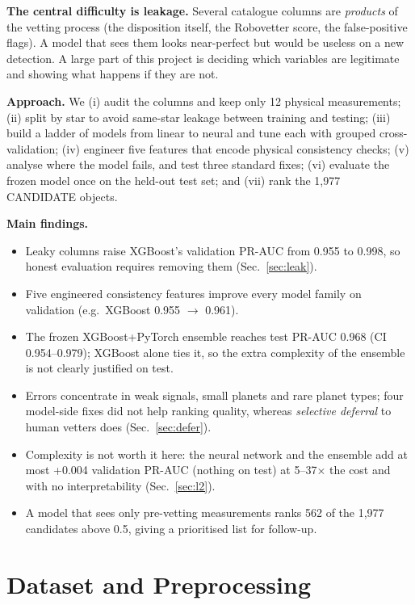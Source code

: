 \documentclass[11pt,a4paper]{article}
\begin{document}
\textbf{The central difficulty is leakage.} Several catalogue columns are \emph{products} of the vetting process (the disposition itself, the Robovetter score, the false-positive flags). A model that sees them looks near-perfect but would be useless on a new detection. A large part of this project is deciding which variables are legitimate and showing what happens if they are not.

\textbf{Approach.} We (i) audit the columns and keep only 12 physical measurements; (ii) split by star to avoid same-star leakage between training and testing; (iii) build a ladder of models from linear to neural and tune each with grouped cross-validation; (iv) engineer five features that encode physical consistency checks; (v) analyse where the model fails, and test three standard fixes; (vi) evaluate the frozen model once on the held-out test set; and (vii) rank the 1,977 CANDIDATE objects.

\textbf{Main findings.}
\begin{itemize}
\item Leaky columns raise XGBoost's validation PR-AUC from 0.955 to 0.998, so honest evaluation requires removing them (Sec.~\ref{sec:leak}).
\item Five engineered consistency features improve every model family on validation (e.g.\ XGBoost 0.955 $\to$ 0.961).
\item The frozen XGBoost+PyTorch ensemble reaches test PR-AUC 0.968 (CI 0.954--0.979); XGBoost alone ties it, so the extra complexity of the ensemble is not clearly justified on test.
\item Errors concentrate in weak signals, small planets and rare planet types; four model-side fixes did not help ranking quality, whereas \emph{selective deferral} to human vetters does (Sec.~\ref{sec:defer}).
\item Complexity is not worth it here: the neural network and the ensemble add at most +0.004 validation PR-AUC (nothing on test) at 5--37$\times$ the cost and with no interpretability (Sec.~\ref{sec:l2}).
\item A model that sees only pre-vetting measurements ranks 562 of the 1,977 candidates above 0.5, giving a prioritised list for follow-up.
\end{itemize}

\section{Dataset and Preprocessing}
\end{document}
